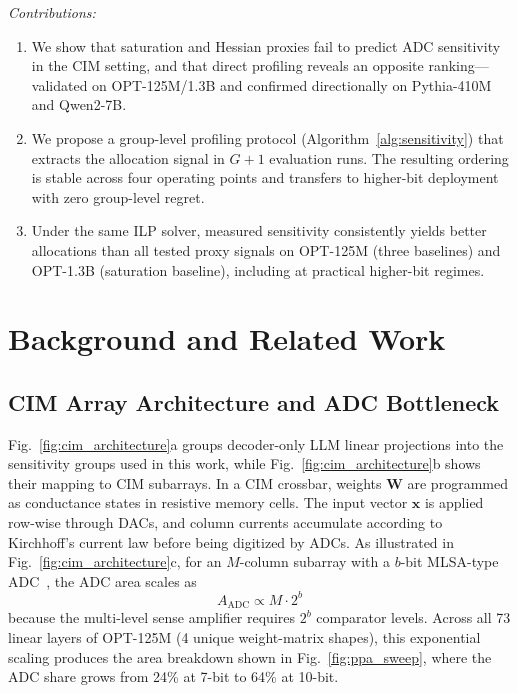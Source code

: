 \documentclass[sigconf,review,anonymous]{acmart}
\begin{document}
\textit{Contributions:}
\begin{enumerate}
  \item We show that saturation and Hessian proxies fail to predict ADC sensitivity in the CIM setting, and that direct profiling reveals an opposite ranking---validated on OPT-125M/1.3B and confirmed directionally on Pythia-410M and Qwen2-7B.

  \item We propose a group-level profiling protocol (Algorithm~\ref{alg:sensitivity}) that extracts the allocation signal in $G{+}1$ evaluation runs. The resulting ordering is stable across four operating points and transfers to higher-bit deployment with zero group-level regret.

  \item Under the same ILP solver, measured sensitivity consistently yields better allocations than all tested proxy signals on OPT-125M (three baselines) and OPT-1.3B (saturation baseline), including at practical higher-bit regimes.
\end{enumerate}

\section{Background and Related Work}
\label{sec:background}

\subsection{CIM Array Architecture and ADC Bottleneck}

Fig.~\ref{fig:cim_architecture}a groups decoder-only LLM linear projections into the sensitivity groups used in this work, while Fig.~\ref{fig:cim_architecture}b shows their mapping to CIM subarrays.
In a CIM crossbar, weights $\mathbf{W}$ are programmed as conductance states in resistive memory cells.
The input vector $\mathbf{x}$ is applied row-wise through DACs, and column currents accumulate according to Kirchhoff's current law before being digitized by ADCs.
As illustrated in Fig.~\ref{fig:cim_architecture}c, for an $M$-column subarray with a $b$-bit MLSA-type ADC~\cite{chen2018neurosim}, the ADC area scales as
\begin{equation}
  A_\text{ADC} \propto M \cdot 2^b
  \label{eq:adc_area}
\end{equation}
because the multi-level sense amplifier requires $2^b$ comparator levels.
Across all 73 linear layers of OPT-125M (4 unique weight-matrix shapes), this exponential scaling produces the area breakdown shown in Fig.~\ref{fig:ppa_sweep}, where the ADC share grows from 24\% at 7-bit to 64\% at 10-bit.
\end{document}
